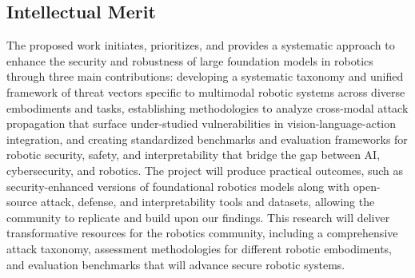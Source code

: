 {\subsection{Intellectual Merit}
The proposed work initiates, prioritizes, and provides a systematic approach to enhance the security and robustness of large foundation models in robotics through three main contributions:  developing a systematic taxonomy and unified framework of threat vectors specific to multimodal robotic systems across diverse embodiments and tasks,  establishing methodologies to analyze cross-modal attack propagation that surface under-studied vulnerabilities in vision-language-action integration, and  creating standardized benchmarks and evaluation frameworks for robotic security, safety, and interpretability that bridge the gap between AI, cybersecurity, and robotics.
The project will produce practical outcomes, such as security-enhanced versions of foundational robotics models along with open-source attack, defense, and interpretability tools and datasets, allowing the community to replicate and build upon our findings. 
This research will deliver transformative resources for the robotics community, including a comprehensive attack taxonomy,  assessment methodologies for different robotic embodiments, and evaluation benchmarks that will advance secure robotic systems.





}
